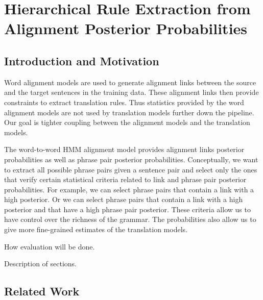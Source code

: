 \chapter{Hierarchical Rule Extraction from Alignment Posterior Probabilities}

\section{Introduction and Motivation}

Word alignment models are used to generate alignment links between
the source and the target sentences in the training data. These
alignment links then provide constraints to extract translation
rules. Thus statistics provided by the word alignment models are
not used by translation models further down the pipeline.
Our goal is tighter coupling between the alignment models and the
translation models.

The word-to-word HMM alignment model provides alignment links
posterior probabilities as well as phrase pair posterior
probabilities. Conceptually, we want to extract all possible phrase pairs given
a sentence pair and select only the ones that verify certain statistical
criteria related to link and phrase pair posterior probabilities. For
example, we can select phrase pairs that contain a link with a high posterior.
Or we can select phrase pairs that contain a link with a high posterior
and that have a high phrase pair posterior. These criteria allow us
to have control over the richness of the grammar. The probabilities
also allow us to give more fine-grained estimates of the translation
models.

How evaluation will be done.

Description of sections.

\section{Related Work}


